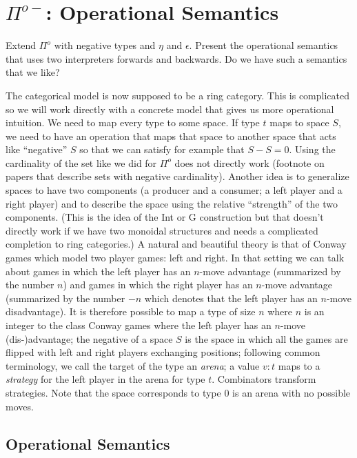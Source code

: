 \documentclass[authoryear,preprint]{sigplanconf}
\begin{document}
\section{$\Pi^{o-}$: Operational Semantics}

Extend $\Pi^{o}$ with negative types and $\eta$ and $\epsilon$. Present the
operational semantics that uses two interpreters forwards and backwards. Do
we have such a semantics that we like? 

The categorical model is now supposed to be a ring category. This is
complicated so we will work directly with a concrete model that gives us more
operational intuition. We need to map every type to some space. If type $t$
maps to space $S$, we need to have an operation that maps that space to
another space that acts like ``negative'' $S$ so that we can satisfy for
example that $S-S=0$. Using the cardinality of the set like we did for
$\Pi^{o}$ does not directly work (footnote on papers that describe sets with
negative cardinality). Another idea is to generalize spaces to have two
components (a producer and a consumer; a left player and a right player) and
to describe the space using the relative ``strength'' of the two
components. (This is the idea of the Int or G construction but that doesn't
directly work if we have two monoidal structures and needs a complicated
completion to ring categories.) A natural and beautiful theory is that of
Conway games which model two player games: left and right. In that setting we
can talk about games in which the left player has an $n$-move advantage
(summarized by the number $n$) and games in which the right player has an
$n$-move advantage (summarized by the number $-n$ which denotes that the left
player has an $n$-move disadvantage). It is therefore possible to map a type
of size $n$ where $n$ is an integer to the class Conway games where the left
player has an $n$-move (dis-)advantage; the negative of a space $S$ is the
space in which all the games are flipped with left and right players
exchanging positions; following common terminology, we call the target of the
type an \emph{arena}; a value $v : t$ maps to a \emph{strategy} for the left
player in the arena for type $t$. Combinators transform strategies. Note that
the space corresponds to type $0$ is an arena with no possible moves.

\subsection{Operational Semantics}
\end{document}
